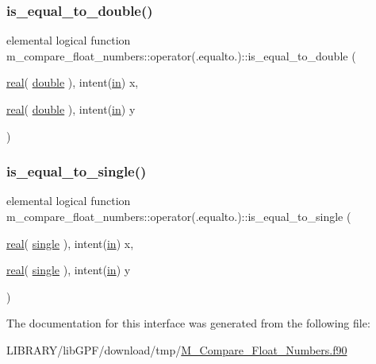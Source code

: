 \subsubsection{\texorpdfstring{is\+\_\+equal\+\_\+to\+\_\+double()}{is\_equal\_to\_double()}}
{\footnotesize\ttfamily elemental logical function m\+\_\+compare\+\_\+float\+\_\+numbers\+::operator(.equalto.)\+::is\+\_\+equal\+\_\+to\+\_\+double (\begin{DoxyParamCaption}\item[{\hyperlink{read__watch_83_8txt_abdb62bde002f38ef75f810d3a905a823}{real}( \hyperlink{namespacem__compare__float__numbers_af4b789cd6e1a2abcd412eaf29e91ea0c}{double} ), intent(\hyperlink{M__journal_83_8txt_afce72651d1eed785a2132bee863b2f38}{in})}]{x,  }\item[{\hyperlink{read__watch_83_8txt_abdb62bde002f38ef75f810d3a905a823}{real}( \hyperlink{namespacem__compare__float__numbers_af4b789cd6e1a2abcd412eaf29e91ea0c}{double} ), intent(\hyperlink{M__journal_83_8txt_afce72651d1eed785a2132bee863b2f38}{in})}]{y }\end{DoxyParamCaption})\hspace{0.3cm}{\ttfamily [private]}}

\mbox{\label{interfacem__compare__float__numbers_1_1operator_07_8equalto_8_08_ace32ebbc1210a68a9bdd0e50faadff23}} 
\subsubsection{\texorpdfstring{is\+\_\+equal\+\_\+to\+\_\+single()}{is\_equal\_to\_single()}}
{\footnotesize\ttfamily elemental logical function m\+\_\+compare\+\_\+float\+\_\+numbers\+::operator(.equalto.)\+::is\+\_\+equal\+\_\+to\+\_\+single (\begin{DoxyParamCaption}\item[{\hyperlink{read__watch_83_8txt_abdb62bde002f38ef75f810d3a905a823}{real}( \hyperlink{namespacem__compare__float__numbers_a5f122d46d6ad7d1cf0b899d9c855c498}{single} ), intent(\hyperlink{M__journal_83_8txt_afce72651d1eed785a2132bee863b2f38}{in})}]{x,  }\item[{\hyperlink{read__watch_83_8txt_abdb62bde002f38ef75f810d3a905a823}{real}( \hyperlink{namespacem__compare__float__numbers_a5f122d46d6ad7d1cf0b899d9c855c498}{single} ), intent(\hyperlink{M__journal_83_8txt_afce72651d1eed785a2132bee863b2f38}{in})}]{y }\end{DoxyParamCaption})\hspace{0.3cm}{\ttfamily [private]}}



The documentation for this interface was generated from the following file\+:\begin{DoxyCompactItemize}
\item 
L\+I\+B\+R\+A\+R\+Y/lib\+G\+P\+F/download/tmp/\hyperlink{M__Compare__Float__Numbers_8f90}{M\+\_\+\+Compare\+\_\+\+Float\+\_\+\+Numbers.\+f90}\end{DoxyCompactItemize}
